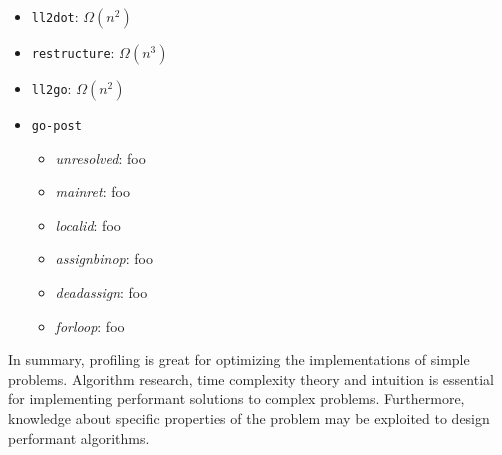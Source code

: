\begin{itemize}
	\item \texttt{ll2dot}: $ \Omega(n^{2}) $
	\item \texttt{restructure}: $ \Omega(n^{3}) $
	\item \texttt{ll2go}: $ \Omega(n^{2}) $
	\item \texttt{go-post}
	\begin{itemize}
		\item \textit{unresolved}: foo
		\item \textit{mainret}: foo
		\item \textit{localid}: foo
		\item \textit{assignbinop}: foo
		\item \textit{deadassign}: foo
		\item \textit{forloop}: foo
	\end{itemize}
\end{itemize}

In summary, profiling is great for optimizing the implementations of simple problems. Algorithm research, time complexity theory and intuition is essential for implementing performant solutions to complex problems. Furthermore, knowledge about specific properties of the problem may be exploited to design performant algorithms.




